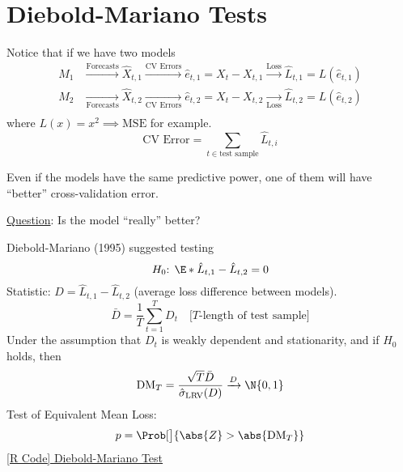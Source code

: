 \section{Diebold-Mariano Tests}
Notice that if we have two models
\begin{align*}
    M_1 & \xrightarrow{\text{Forecasts}} \hat{X}_{t,1} \xrightarrow{\text{CV Errors}} \hat{e}_{t,1}=X_t-X_{t,1} \xrightarrow{\text{Loss}} \hat{L}_{t,1}=L(\hat{e}_{t,1})     \\
    M_2 & \xrightarrow[\text{Forecasts}]{}\hat{X}_{t,2}\xrightarrow[\text{CV Errors}]{} \hat{e}_{t,2}=X_t-X_{t,2} \xrightarrow[\text{Loss}]{} \hat{L}_{t,2}=L(\hat{e}_{t,2}) \\
\end{align*}
where $ L(x)=x^2 \implies \text{MSE} $ for example.
\[ \text{CV Error}=\sum_{t\in\text{test sample}}\hat{L}_{t,i}  \]
\begin{Remark}{}{}
    Even if the models have the same predictive power, one of them will have ``better''
    cross-validation error.

    \underline{Question}: Is the model ``really'' better?
\end{Remark}
Diebold-Mariano (1995) suggested testing
\[ \text{$H_0$: }\E*{\hat{L}_{t,1}-\hat{L}_{t,2}}=0 \]
Statistic: $ D=\hat{L}_{t,1}-\hat{L}_{t,2} $ (average loss difference between models).
\[ \bar{D}=\frac{1}{T} \sum_{t=1}^{T} D_t\quad\text{[$T$-length of test sample]} \]
Under the assumption that $ D_t $ is weakly dependent and stationarity, and if $ H_0 $
holds, then
\[ \text{DM}_T=\frac{\sqrt{T}\bar{D}}{\hat{\sigma}_{\text{LRV}}(D)}\xrightarrow{D}\N{0,1}  \]
Test of Equivalent Mean Loss:
\[ p=\Prob[\big]{\abs{Z}>\abs{\text{DM}_T}} \]
\href{https://github.com/Hextical/university-notes/blob/master/year-3/semester-2/STAT%20443/code/10.6%20-%20Diebold%20Mariano%20Test.R}{[R Code] Diebold-Mariano Test}
